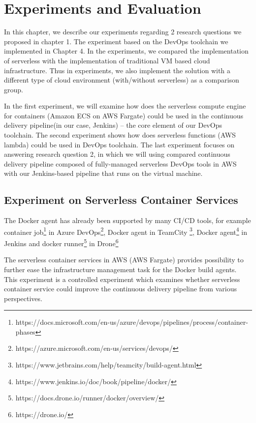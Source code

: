 \chapter{Experiments and Evaluation}
In this chapter, we describe our experiments regarding 2 research questions we proposed in chapter 1. The experiment based on the DevOps toolchain we implemented in Chapter 4. In the experiments, we compared the implementation of serverless with the implementation of traditional VM based cloud infrastructure. Thus in experiments, we also implement the solution with a different type of cloud environment (with/without serverless) as a comparison group.
\par
In the first experiment, we will examine how does the serverless compute engine for containers (Amazon ECS on AWS Fargate) could be used in the continuous delivery pipeline(in our case, Jenkins) -- the core element of our DevOps toolchain. The second experiment shows how does serverless functions (AWS lambda) could be used in DevOps toolchain. The last experiment focuses on answering research question 2, in which we will using compared continuous delivery pipeline composed of fully-managed serverless DevOps tools in AWS with our Jenkins-based pipeline that runs on the virtual machine.
\section{Experiment on Serverless Container Services}
The Docker agent has already been supported by many CI/CD tools, for example container job\footnote{https://docs.microsoft.com/en-us/azure/devops/pipelines/process/container-phases} in Azure DevOps\footnote{https://azure.microsoft.com/en-us/services/devops/}, Docker agent in TeamCity \footnote{https://www.jetbrains.com/help/teamcity/build-agent.html}, Docker agent\footnote{https://www.jenkins.io/doc/book/pipeline/docker/} in Jenkins and docker runner\footnote{https://docs.drone.io/runner/docker/overview/} in Drone\footnote{https://drone.io/}
\par
The serverless container services in AWS (AWS Fargate) provides possibility to further ease the infrastructure management task for the Docker build agents. 
This experiment is a controlled experiment which examines whether serverless container service could improve the continuous delivery pipeline from various perspectives.
